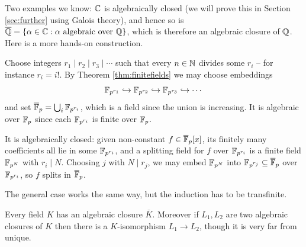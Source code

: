 \documentclass[a4paper]{scrartcl}
\begin{document}
Two examples we know: $\mathbb{C}$ is algebraically closed (we will prove this in Section \ref{sec:further} using Galois theory), and hence so is $\overline{\mathbb{Q}} = \{\alpha \in \mathbb{C} : \alpha \text{ algebraic over } \mathbb{Q}\}$, which is therefore an algebraic closure of $\mathbb{Q}$. Here is a more hands-on construction.

\begin{example}
	Choose integers $r_1 \mid r_2 \mid r_3 \mid \cdots$ such that every $n \in \mathbb{N}$ divides some $r_i$ -- for instance $r_i = i!$. By Theorem \ref{thm:finitefields} we may choose embeddings
	$$\mathbb{F}_{p^{r_1}} \hookrightarrow \mathbb{F}_{p^{r_2}} \hookrightarrow \mathbb{F}_{p^{r_3}} \hookrightarrow \cdots$$
	and set $\overline{\mathbb{F}}_p = \bigcup_i \mathbb{F}_{p^{r_i}}$, which is a field since the union is increasing. It is algebraic over $\mathbb{F}_p$ since each $\mathbb{F}_{p^{r_i}}$ is finite over $\mathbb{F}_p$.

	It is algebraically closed: given non-constant $f \in \overline{\mathbb{F}}_p[x]$, its finitely many coefficients all lie in some $\mathbb{F}_{p^{r_i}}$, and a splitting field for $f$ over $\mathbb{F}_{p^{r_i}}$ is a finite field $\mathbb{F}_{p^N}$ with $r_i \mid N$. Choosing $j$ with $N \mid r_j$, we may embed $\mathbb{F}_{p^N}$ into $\mathbb{F}_{p^{r_j}} \subseteq \overline{\mathbb{F}}_p$ over $\mathbb{F}_{p^{r_i}}$, so $f$ splits in $\overline{\mathbb{F}}_p$.
\end{example}

The general case works the same way, but the induction has to be transfinite.

\begin{theorem}
	Every field $K$ has an algebraic closure $\overline K$. Moreover if $L_1, L_2$ are two algebraic closures of $K$ then there is a $K$-isomorphism $L_1 \to L_2$, though it is very far from unique.
\end{theorem}
\end{document}
